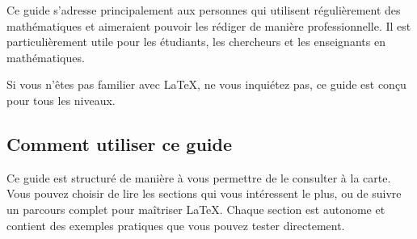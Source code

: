 Ce guide s'adresse principalement aux personnes qui utilisent régulièrement des 
mathématiques et aimeraient pouvoir les rédiger de manière professionnelle.
Il est particulièrement utile pour les étudiants, les chercheurs et les enseignants en mathématiques.

Si vous n'êtes pas familier avec LaTeX, ne vous inquiétez pas, ce guide est conçu pour tous les niveaux.

\subsection{Comment utiliser ce guide}\label{subsec:how_to_use_this_guide}

Ce guide est structuré de manière à vous permettre de le consulter à la carte.
Vous pouvez choisir de lire les sections qui vous intéressent le plus,
ou de suivre un parcours complet pour maîtriser LaTeX.
Chaque section est autonome et contient des exemples pratiques que vous pouvez tester directement.